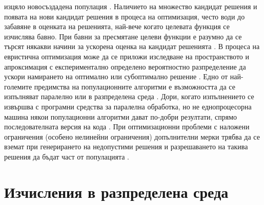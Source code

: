 изцяло новосъздадена популация \cite{Wegener-01}. Наличието на множество кандидат решения и появата на нови кандидат решения в процеса на оптимизация, често води до забавяне в оценката на решенията, най-вече когато целевата функция се изчислява бавно. При бавни за пресмятане целеви функции \cite{Naudts-01} е разумно да се търсят някакви начини за ускорена оценка на кандидат решенията \cite{Salami-01}. В процеса на евристична оптимизация може да се приложи изследване на пространството и апроксимация с експериментално определено вероятностно разпределение да ускори намирането на оптимално или субоптимално решение \cite{Kern-01}. Едно от най-големите предимства на популационните алгоритми е възможността да се изпълняват паралелно или в разпределена среда \cite{Vikhar-01}. Дори, когато изпълнението се извършва с програмни средства за паралелна обработка, но не еднопроцесорна машина някои популационни алгоритми дават по-добри резултати, спрямо последователната версия на кода \cite{Alba-01}. При оптимизационни проблеми с наложени ограничения (особено нелинейни ограничения) допълнителни мерки трябва да се вземат при генерирането на недопустими решения и разрешаването на такива решения да бъдат част от популацията \cite{Lagaros-01}.

\section{Изчисления в разпределена среда}

